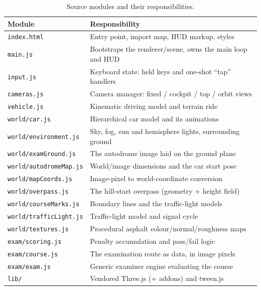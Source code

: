 \documentclass[11pt]{article}
\newcommand{\code}[1]{\texttt{#1}}
\begin{document}
\begin{table}[h]
  \centering
  \caption{Source modules and their responsibilities.}
  \label{tab:modules}
  \small
  \begin{tabular}{@{}lp{}@{}}
    \toprule
    Module & Responsibility \\
    \midrule
    \code{index.html} & Entry point, import map, HUD markup, styles \\
    \code{main.js} & Bootstraps the renderer/scene, owns the main loop and HUD \\
    \code{input.js} & Keyboard state: held keys and one-shot ``tap'' handlers \\
    \code{cameras.js} & Camera manager: fixed / cockpit / top / orbit views \\
    \code{vehicle.js} & Kinematic driving model and terrain ride \\
    \code{world/car.js} & Hierarchical car model and its animations \\
    \code{world/environment.js} & Sky, fog, sun and hemisphere lights, surrounding ground \\
    \code{world/examGround.js} & The autodrome image laid on the ground plane \\
    \code{world/autodromeMap.js} & World/image dimensions and the car start pose \\
    \code{world/mapCoords.js} & Image-pixel to world-coordinate conversion \\
    \code{world/overpass.js} & The hill-start overpass (geometry + height field) \\
    \code{world/courseMarks.js} & Boundary lines and the traffic-light models \\
    \code{world/trafficLight.js} & Traffic-light model and signal cycle \\
    \code{world/textures.js} & Procedural asphalt colour/normal/roughness maps \\
    \code{exam/scoring.js} & Penalty accumulation and pass/fail logic \\
    \code{exam/course.js} & The examination route as data, in image pixels \\
    \code{exam/exam.js} & Generic examiner engine evaluating the course \\
    \code{lib/} & Vendored Three.js (+ addons) and tween.js \\
    \bottomrule
  \end{tabular}
\end{table}
\end{document}
